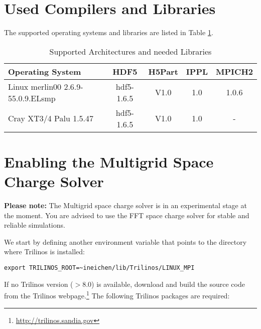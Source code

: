 \clearpage
\section{Used Compilers and Libraries}
The supported operating systems and libraries are listed in Table \ref{tab:archlib}.
\begin{table}[Ht]
  \caption{Supported Architectures and needed Libraries}
  \label{tab:archlib}
  \begin{center}
    \begin{tabular}{|lcccc|}
      \hline
      Operating System & HDF5  & H5Part & IPPL & MPICH2\\
      \hline
      Linux merlin00 2.6.9-55.0.9.ELsmp & hdf5-1.6.5 & V1.0 & 1.0 & 1.0.6 \\
      Cray XT3/4 Palu 1.5.47 & hdf5-1.6.5 & V1.0 & 1.0 & - \\
      \hline
    \end{tabular}
  \end{center}
\end{table}

\section{Enabling the Multigrid Space Charge Solver}

{\bf Please note:} The Multigrid space charge solver is in an experimental stage at the moment. You are advised to use the FFT space charge solver for stable and reliable simulations.

We start by defining another environment variable that points to the directory where Trilinos is installed:
\begin{verbatim}
export TRILINOS_ROOT=~ineichen/lib/Trilinos/LINUX_MPI
\end{verbatim}
If no Trilinos version ($>$8.0) is available, download and build the source code from the Trilinos webpage.\footnote{\url{http://trilinos.sandia.gov}} The following Trilinos packages are required:

